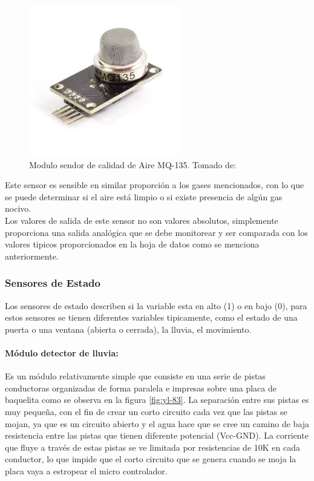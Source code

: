 \begin{figure}[H]
	\centering
	\caption{Modulo sendor de calidad de Aire MQ-135. Tomado de: \cite{MQ1}}
	\label{fig:sensor-calidad-aire-mq135}
	\includegraphics[width=0.35\linewidth]{Imagenes/sensor-calidad-aire-mq135}
\end{figure}

Este sensor es sensible en similar proporción a los gases mencionados, con lo que se puede determinar si el aire está limpio o si existe presencia de algún gas nocivo.\\

Los valores de salida de este sensor no son valores absolutos, simplemente proporciona una salida analógica que se debe monitorear y ser comparada con los valores tipicos proporcionados en la hoja de datos como se menciona anteriormente.\cite{MQ2}

\subsubsection{Sensores de Estado}

Los sensores de estado describen si la variable esta en alto (1) o en bajo (0), para estos sensores se tienen diferentes variables tipicamente, como el estado de una puerta o una ventana (abierta o cerrada), la lluvia, el movimiento.

\paragraph{Módulo detector de lluvia: }

Es un módulo relativamente simple que consiste en una serie de pistas conductoras organizadas de forma paralela e impresas sobre una placa de baquelita como se observa en la figura \ref{fig:yl-83}. La separación entre sus pistas 
es muy pequeña, con el fin de crear un corto circuito cada vez que las pistas se mojan, ya que es un circuito abierto y el agua hace que se cree un camino de baja resistencia entre las pistas que tienen diferente potencial (Vcc-GND). La corriente que fluye a través de estas pistas se ve limitada por resistencias de 10K en cada conductor, lo que impide que el corto circuito que se genera cuando se moja la placa vaya a estropear el micro controlador.\cite{LLU}


